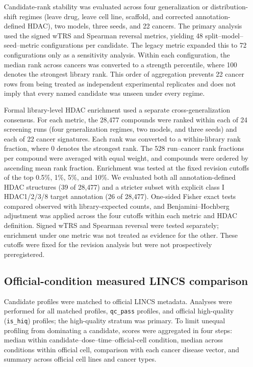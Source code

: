 Candidate-rank stability was evaluated across four generalization or distribution-shift regimes (leave drug, leave cell line, scaffold, and corrected annotation-defined HDAC), two models, three seeds, and 22 cancers. The primary analysis used the signed wTRS and Spearman reversal metrics, yielding 48 split--model--seed--metric configurations per candidate. The legacy metric expanded this to 72 configurations only as a sensitivity analysis. Within each configuration, the median rank across cancers was converted to a strength percentile, where 100 denotes the strongest library rank. This order of aggregation prevents 22 cancer rows from being treated as independent experimental replicates and does not imply that every named candidate was unseen under every regime.

Formal library-level HDAC enrichment used a separate cross-generalization consensus. For each metric, the 28,477 compounds were ranked within each of 24 screening runs (four generalization regimes, two models, and three seeds) and each of 22 cancer signatures. Each rank was converted to a within-library rank fraction, where 0 denotes the strongest rank. The 528 run--cancer rank fractions per compound were averaged with equal weight, and compounds were ordered by ascending mean rank fraction. Enrichment was tested at the fixed revision cutoffs of the top 0.5\%, 1\%, 5\%, and 10\%. We evaluated both all annotation-defined HDAC structures (39 of 28,477) and a stricter subset with explicit class I HDAC1/2/3/8 target annotation (26 of 28,477). One-sided Fisher exact tests compared observed with library-expected counts, and Benjamini--Hochberg adjustment was applied across the four cutoffs within each metric and HDAC definition. Signed wTRS and Spearman reversal were tested separately; enrichment under one metric was not treated as evidence for the other. These cutoffs were fixed for the revision analysis but were not prospectively preregistered.

\subsection{Official-condition measured LINCS comparison}

Candidate profiles were matched to official LINCS metadata. Analyses were performed for all matched profiles, \texttt{qc\_pass} profiles, and official high-quality (\texttt{is\_hiq}) profiles; the high-quality stratum was primary. To limit unequal profiling from dominating a candidate, scores were aggregated in four steps: median within candidate--dose--time--official-cell condition, median across conditions within official cell, comparison with each cancer disease vector, and summary across official cell lines and cancer types.

